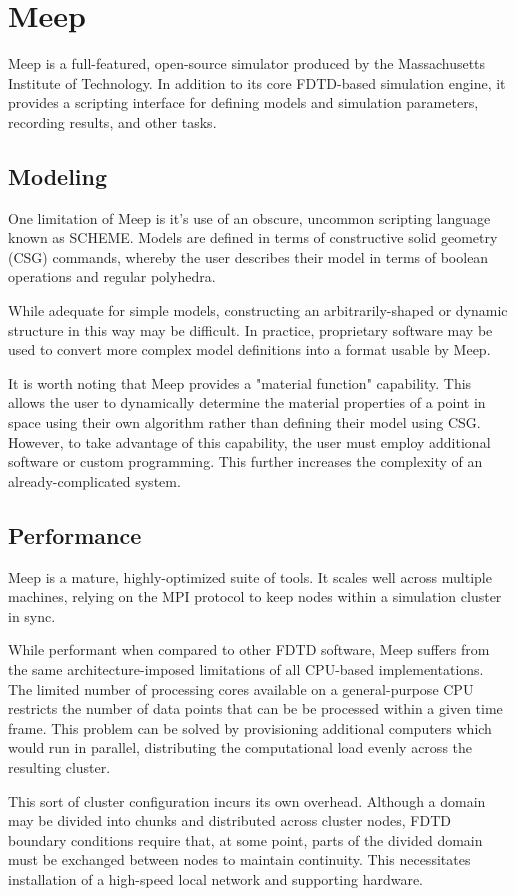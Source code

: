 \chapter{Meep} \label{ch:meep}

Meep\cite{OskooiRo10} is a full-featured, open-source simulator produced by the Massachusetts Institute of Technology. In addition to its core FDTD-based simulation engine, it provides a scripting interface for defining models and simulation parameters, recording results, and other tasks.  


\section{Modeling}

One limitation of Meep is it's use of an obscure, uncommon scripting language known as SCHEME. Models are defined in terms of constructive solid geometry (CSG) commands, whereby the user describes their model in terms of boolean operations and regular polyhedra. 

While adequate for simple models, constructing an arbitrarily-shaped or dynamic structure in this way may be difficult. In practice, proprietary software may be used to convert more complex model definitions into a format usable by Meep.

It is worth noting that Meep provides a "material function" capability. This allows the user to dynamically determine the material properties of a point in space using their own algorithm rather than defining their model using CSG. However, to take advantage of this capability, the user must employ additional software or custom programming. This further increases the complexity of an already-complicated system. 



\section{Performance}

Meep is a mature, highly-optimized suite of tools. It scales well across multiple machines, relying on the MPI protocol to keep nodes within a simulation cluster in sync. 

While performant when compared to other FDTD software, Meep suffers from the same architecture-imposed limitations of all CPU-based implementations. The limited number of processing cores available on a general-purpose CPU restricts the number of data points that can be be processed within a given time frame. This problem can be solved by provisioning additional computers which would run in parallel, distributing the computational load evenly across the resulting cluster.

This sort of cluster configuration incurs its own overhead. Although a domain may be divided into chunks and distributed across cluster nodes, FDTD boundary conditions require that, at some point, parts of the divided domain must be exchanged between nodes to maintain continuity. This necessitates installation of a high-speed local network and supporting hardware. 





